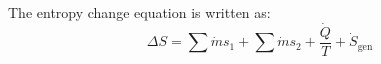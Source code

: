 The entropy change equation is written as:  
\[
\Delta S = \sum \dot{m}s_1 + \sum \dot{m}s_2 + \frac{\dot{Q}}{T} + \dot{S}_{\text{gen}}
\]
